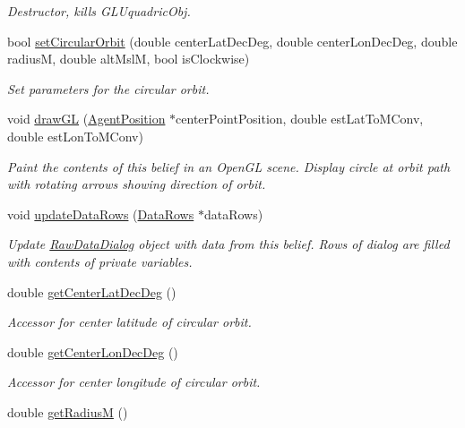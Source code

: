 \begin{DoxyCompactItemize}
\begin{DoxyCompactList}\small\item\em Destructor, kills GLUquadricObj. \end{DoxyCompactList}\item 
bool \hyperlink{class_circular_orbit_belief_a3bff3e0503e6b5b47ea0a2a4dfb73cac}{setCircularOrbit} (double centerLatDecDeg, double centerLonDecDeg, double radiusM, double altMslM, bool isClockwise)
\begin{DoxyCompactList}\small\item\em Set parameters for the circular orbit. \end{DoxyCompactList}\item 
void \hyperlink{class_circular_orbit_belief_a24aa41df680f5ed50114672aa02d1680}{drawGL} (\hyperlink{class_agent_position}{AgentPosition} $\ast$centerPointPosition, double estLatToMConv, double estLonToMConv)
\begin{DoxyCompactList}\small\item\em Paint the contents of this belief in an OpenGL scene. Display circle at orbit path with rotating arrows showing direction of orbit. \end{DoxyCompactList}\item 
void \hyperlink{class_circular_orbit_belief_a06a40bc8e475f6f443edcfb56713860d}{updateDataRows} (\hyperlink{struct_data_rows}{DataRows} $\ast$dataRows)
\begin{DoxyCompactList}\small\item\em Update \hyperlink{class_raw_data_dialog}{RawDataDialog} object with data from this belief. Rows of dialog are filled with contents of private variables. \end{DoxyCompactList}\item 
double \hyperlink{class_circular_orbit_belief_a5d1df33e08616a231fa37678186d9ed4}{getCenterLatDecDeg} ()
\begin{DoxyCompactList}\small\item\em Accessor for center latitude of circular orbit. \end{DoxyCompactList}\item 
double \hyperlink{class_circular_orbit_belief_a2c04d31d6b5798bb49f4aef80867740b}{getCenterLonDecDeg} ()
\begin{DoxyCompactList}\small\item\em Accessor for center longitude of circular orbit. \end{DoxyCompactList}\item 
double \hyperlink{class_circular_orbit_belief_afde488e8eea71ed60a4d2583503a4eb8}{getRadiusM} ()

\end{DoxyCompactItemize}
